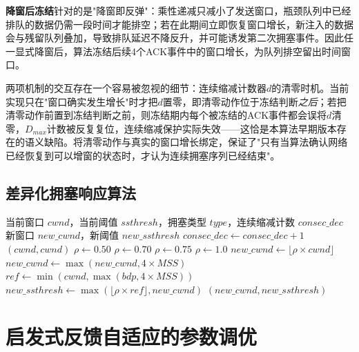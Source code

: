 \textbf{降窗后冻结}针对的是"降窗即反弹"：乘性递减只减小了发送窗口，瓶颈队列中已经排队的数据仍需一段时间才能排空；若在此期间立即恢复窗口增长，新注入的数据会与残留队列叠加，导致排队延迟不降反升，并可能诱发第二次拥塞事件。因此任一显式降窗后，算法冻结后续4个ACK事件中的窗口增长，为队列排空留出时间窗口。

两项机制的交互存在一个容易被忽视的细节：连续缩减计数器$d$的清零时机。当前实现只在"窗口确实发生增长"时才把$d$置零，即清零动作位于冻结判断\emph{之后}；若把清零动作前置到冻结判断之前，则冻结期内每个被冻结的ACK事件都会误将$d$清零，$D_{max}$计数被反复复位，连续缩减保护实际失效——这恰是本算法早期版本存在的语义缺陷。将清零动作与真实的窗口增长绑定，保证了"只有当算法确认网络已经恢复到可以增窗的状态时，才认为连续拥塞序列已经结束"。

\subsection{差异化拥塞响应算法}

\begin{algorithm}[htbp]
\caption{差异化拥塞响应算法}
\begin{algorithmic}[1]
\Require 当前窗口 $cwnd$，当前阈值 $ssthresh$，拥塞类型 $type$，连续缩减计数 $consec\_dec$
\Ensure 新窗口 $new\_cwnd$，新阈值 $new\_ssthresh$
\State $consec\_dec \leftarrow consec\_dec + 1$
\State {}
    \State \Return $(cwnd, cwnd)$ 
\EndIf
\State {}
    \State $\rho \leftarrow 0.50$ 
    \State $\rho \leftarrow 0.70$ 
    \State $\rho \leftarrow 0.75$ 
\Else
    \State $\rho \leftarrow 1.0$ 
\EndIf
\State {}
\State $new\_cwnd \leftarrow \lfloor \rho \times cwnd \rfloor$
\State {}
\State $new\_cwnd \leftarrow \max(new\_cwnd, 4 \times MSS)$
\State {}
\State $ref \leftarrow \min(cwnd, \max(bdp, 4 \times MSS))$
\State $new\_ssthresh \leftarrow \max(\lfloor \rho \times ref \rfloor, new\_cwnd)$
\State \Return $(new\_cwnd, new\_ssthresh)$
\end{algorithmic}
\end{algorithm}

\section{启发式反馈自适应的参数调优}
\label{sec:adaptive-alpha}

